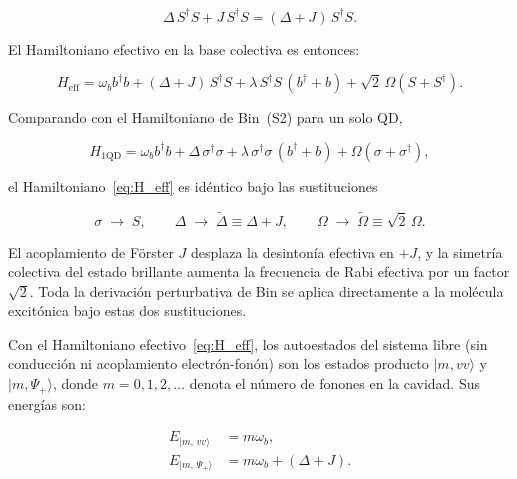 \documentclass[12pt]{article}
\begin{document}
	\begin{equation}
		\Delta\, S^\dagger S + J\, S^\dagger S
		= (\Delta + J)\, S^\dagger S.
	\end{equation}
	
	\noindent
	El Hamiltoniano efectivo en la base colectiva es entonces:
	
	\begin{equation}
		\boxed{
			H_{\mathrm{eff}} = \omega_b b^\dagger b
			+ (\Delta + J)\,S^\dagger S
			+ \lambda\, S^\dagger S\,(b^\dagger + b)
			+ \sqrt{2}\,\Omega\left(S + S^\dagger\right).
		}
		\label{eq:H_eff}
	\end{equation}
	
	\medskip
	\noindent
	Comparando con el Hamiltoniano de Bin~(S2) para un solo QD,
	
	\begin{equation}
		H_{\mathrm{1QD}} = \omega_b b^\dagger b
		+ \Delta\,\sigma^\dagger\sigma
		+ \lambda\,\sigma^\dagger\sigma\,(b^\dagger + b)
		+ \Omega\left(\sigma + \sigma^\dagger\right),
	\end{equation}
	
	el Hamiltoniano~\eqref{eq:H_eff} es id\'entico bajo las sustituciones
	
	\begin{equation}
		\sigma \;\to\; S,
		\qquad
		\Delta \;\to\; \widetilde{\Delta} \equiv \Delta + J,
		\qquad
		\Omega \;\to\; \widetilde{\Omega} \equiv \sqrt{2}\,\Omega.
		\label{eq:correspondencia}
	\end{equation}
	
	El acoplamiento de F\"orster $J$ desplaza la desinton\'ia efectiva en $+J$,
	y la simetr\'ia colectiva del estado brillante aumenta la frecuencia de Rabi
	efectiva por un factor $\sqrt{2}$. Toda la derivaci\'on perturbativa de Bin
	se aplica directamente a la mol\'ecula excit\'onica bajo estas dos
	sustituciones.
	
	Con el Hamiltoniano efectivo~\eqref{eq:H_eff}, los autoestados del sistema
	libre (sin conducci\'on ni acoplamiento electr\'on-fon\'on) son los estados
	producto $|m, vv\rangle$ y $|m, \Psi_+\rangle$, donde $m = 0, 1, 2, \ldots$
	denota el n\'umero de fonones en la cavidad. Sus energ\'ias son:
	
	\begin{align}
		E_{|m,\, vv\rangle} &= m\omega_b,
		\label{eq:E_vv}\\[4pt]
		E_{|m,\, \Psi_+\rangle} &= m\omega_b + (\Delta + J).
		\label{eq:E_Psi}
	\end{align}
	
\end{document}
